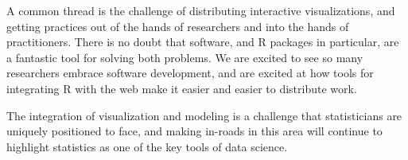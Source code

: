 \documentclass[preprint]{imsart}
\begin{document}
A common thread is the challenge of distributing interactive visualizations, and getting practices out of the hands of researchers and into the hands of practitioners. There is no doubt that software, and R packages in particular, are a fantastic tool for solving both problems. We are excited to see so many researchers embrace software development, and are excited at how tools for integrating R with the web make it easier and easier to distribute work.

The integration of visualization and modeling is a challenge that statisticians are uniquely positioned to face, and making in-roads in this area will continue to highlight statistics as one of the key tools of data science.



\end{document}
